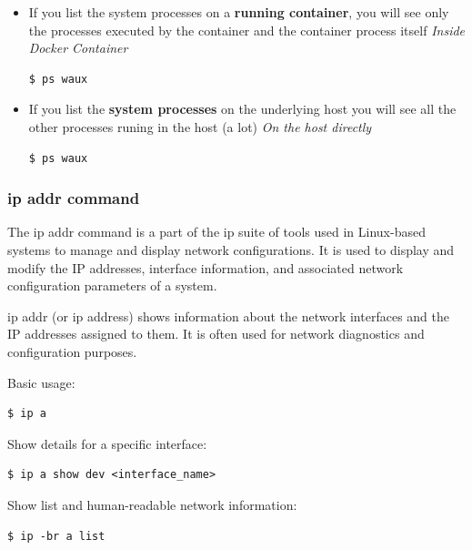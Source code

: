 \documentclass{article}
\newenvironment{codetemplate}[1][]{%
  \mybasecolorbox[#1]
  \itshape
}{%
  \endmybasecolorbox
}
\begin{document}
\begin{itemize}
    \item If you list the system processes on a \textbf{running container}, you will see only the processes executed by the container and the container process itself
\begin{codetemplate}{Inside Docker Container}
\begin{verbatim}
$ ps waux
\end{verbatim}
\end{codetemplate}

    \item If you list the \textbf{system processes} on the underlying host you will see all the other processes runing in the host (a lot)
\begin{codetemplate}{On the host directly}
\begin{verbatim}
$ ps waux
\end{verbatim}
\end{codetemplate}
\end{itemize}

\subsubsection{ip addr command}
The ip addr command is a part of the ip suite of tools used in Linux-based systems to manage and display network configurations. It is used to display and modify the IP addresses, interface information, and associated network configuration parameters of a system.

ip addr (or ip address) shows information about the network interfaces and the IP addresses assigned to them. It is often used for network diagnostics and configuration purposes.

Basic usage:
\begin{codetemplate}{}
\begin{verbatim}
$ ip a
\end{verbatim}
\end{codetemplate}

Show details for a specific interface:
\begin{codetemplate}{}
\begin{verbatim}
$ ip a show dev <interface_name>
\end{verbatim}
\end{codetemplate}

Show list and human-readable network information:
\begin{codetemplate}{}
\begin{verbatim}
$ ip -br a list
\end{verbatim}
\end{codetemplate}
\end{document}
